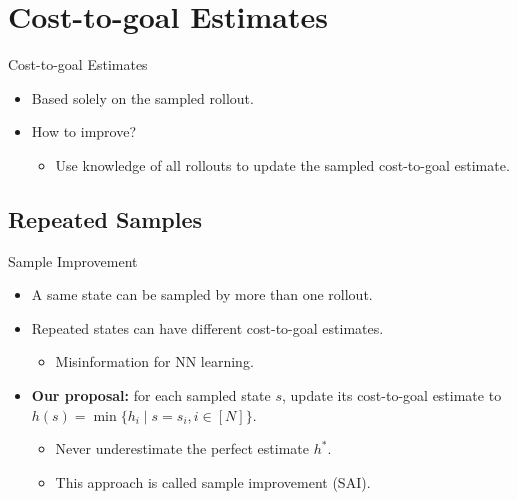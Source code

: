 \documentclass{gkibeamer}
\begin{document}
\section{Cost-to-goal Estimates}

\begin{frame}{Cost-to-goal Estimates}
\begin{itemize}
    \item Based solely on the sampled rollout.

    \bigskip \pause
    
    \item How to improve?
    \begin{itemize}
        \item Use knowledge of all rollouts to update the sampled cost-to-goal estimate.
    \end{itemize}
\end{itemize}
\end{frame}


\subsection{Repeated Samples}

\begin{frame}{Sample Improvement}
\begin{itemize}
    \item A same state can be sampled by more than one rollout.
    \pause
    \item Repeated states can have different cost-to-goal estimates.
    \begin{itemize}
        \item Misinformation for NN learning.
    \end{itemize}
\end{itemize}
\bigskip \pause
\begin{itemize}
    \item \textbf{Our proposal:} for each sampled state $s$, update its cost-to-goal estimate to $h(s) = \min\{h_i \mid s=s_i, i\in[N]\}$.
    \begin{itemize}
        \item Never underestimate the perfect estimate $h^*$.
        \item This approach is called \alert{sample improvement} (SAI).
    \end{itemize}
\end{itemize}
\end{frame}
\end{document}
